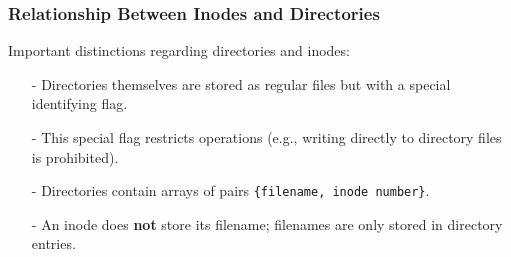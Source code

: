 \documentclass[../../compsys.tex]{subfiles}
\begin{document}
\subsubsection{Relationship Between Inodes and Directories}
Important distinctions regarding directories and inodes:
\begin{itemize}
  \item[-] Directories themselves are stored as regular files but with a special identifying flag.
  \item[-] This special flag restricts operations (e.g., writing directly to directory files is prohibited).
  \item[-] Directories contain arrays of pairs \texttt{\{filename, inode number\}}.
  \item[-] An inode does \textbf{not} store its filename; filenames are only stored in directory entries.
\end{itemize}

\newpage
\end{document}
